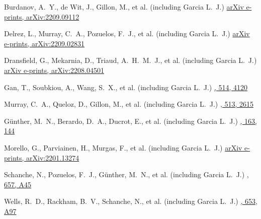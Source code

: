 
{Burdanov, A.~Y., de Wit, J., Gillon, M., et al. (including Garcia L.~J.)}
{\href{https://ui.adsabs.harvard.edu/abs/2022arXiv220909112B}{arXiv e-prints, arXiv:2209.09112}}

{Delrez, L., Murray, C.~A., Pozuelos, F.~J., et al. (including Garcia L.~J.)}
{\href{https://ui.adsabs.harvard.edu/abs/2022arXiv220902831D}{arXiv e-prints, arXiv:2209.02831}}

{Dransfield, G., Mekarnia, D., Triaud, A.~H.~M.~J., et al. (including Garcia L.~J.)}
{\href{https://ui.adsabs.harvard.edu/abs/2022arXiv220804501D}{arXiv e-prints, arXiv:2208.04501}}

{Gan, T., Soubkiou, A., Wang, S.~X., et al. (including Garcia L.~J.)}
{\href{https://ui.adsabs.harvard.edu/abs/2022MNRAS.514.4120G}{\mnras, 514, 4120}}

{Murray, C.~A., Queloz, D., Gillon, M., et al. (including Garcia L.~J.)}
{\href{https://ui.adsabs.harvard.edu/abs/2022MNRAS.513.2615M}{\mnras, 513, 2615}}

{G{\"u}nther, M.~N., Berardo, D.~A., Ducrot, E., et al. (including Garcia L.~J.)}
{\href{https://ui.adsabs.harvard.edu/abs/2022AJ....163..144G}{\aj, 163, 144}}

{Morello, G., Parviainen, H., Murgas, F., et al. (including Garcia L.~J.)}
{\href{https://ui.adsabs.harvard.edu/abs/2022arXiv220113274M}{arXiv e-prints, arXiv:2201.13274}}

{Schanche, N., Pozuelos, F.~J., G{\"u}nther, M.~N., et al. (including Garcia L.~J.)}
{\href{https://ui.adsabs.harvard.edu/abs/2022A\&A...657A..45S}{\aap, 657, A45}}

{Wells, R.~D., Rackham, B.~V., Schanche, N., et al. (including Garcia L.~J.)}
{\href{https://ui.adsabs.harvard.edu/abs/2021A\&A...653A..97W}{\aap, 653, A97}}

